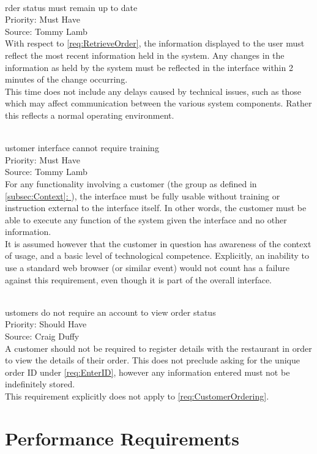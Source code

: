 \documentclass[11pt, a4paper]{report}
\newcommand{\gref}[1]{\hyperref[#1]{\autoref*{#1}: \nameref{#1}}} %
\def\itempar#1\\{\item \textbf{#1}\\} %
\begin{document}
\begin{enumerate}[label=NF-UR-\arabic*, series=nonfunctional]
\itempar Order status must remain up to date\\
Priority: Must Have\\
Source: Tommy Lamb\\
With respect to \autoref{req:RetrieveOrder}, the information displayed to the user must reflect the most recent information held in the system. Any changes in the information as held by the system must be reflected in the interface within 2 minutes of the change occurring.\\
This time does not include any delays caused by technical issues, such as those which may affect communication between the various system components. Rather this reflects a normal operating environment.

\itempar Customer interface cannot require training\\
Priority: Must Have\\
Source: Tommy Lamb\\
For any functionality involving a customer (the group as defined in \gref{subsec:Context}), the interface must be fully usable without training or instruction external to the interface itself. In other words, the customer must be able to execute any function of the system given the interface and no other information.\\
It is assumed however that the customer in question has awareness of the context of usage, and a basic level of technological competence. Explicitly, an inability to use a standard web browser (or similar event) would not count has a failure against this requirement, even though it is part of the overall interface.

\itempar Customers do not require an account to view order status\\
Priority: Should Have\\
Source: Craig Duffy\\
A customer should not be required to register details with the restaurant in order to view the details of their order. This does not preclude asking for the unique order ID under \autoref{req:EnterID}, however any information entered must not be indefinitely stored.\\
This requirement explicitly does not apply to \autoref{req:CustomerOrdering}.

\end{enumerate}

\section{Performance Requirements} \label{sec:Performance}
\end{document}
